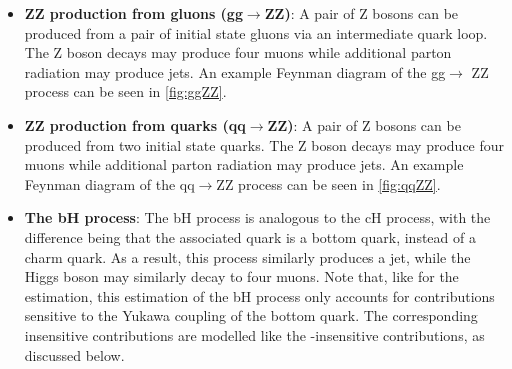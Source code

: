 \begin{itemize}
    \item \textbf{ZZ production from gluons (gg$\rightarrow$ZZ)}: A pair of Z bosons can be produced from a pair of initial state gluons via an intermediate quark loop. The Z boson decays may produce four muons while additional parton radiation may produce jets. An example Feynman diagram of the gg$\rightarrow$ ZZ process can be seen in \autoref{fig:ggZZ}.
    \item \textbf{ZZ production from quarks (qq$\rightarrow$ZZ)}: A pair of Z bosons can be produced from two initial state quarks. The Z boson decays may produce four muons while additional parton radiation may produce jets. An example Feynman diagram of the qq$\rightarrow$ZZ process can be seen in \autoref{fig:qqZZ}.
    \item \textbf{The bH process}: The bH process is analogous to the cH process, with the difference being that the associated quark is a bottom quark, instead of a charm quark. As a result, this process similarly produces a jet, while the Higgs boson may similarly decay to four muons. Note that, like for the \cHZZsen estimation, this estimation of the bH process only accounts for contributions sensitive to the Yukawa coupling of the bottom quark. The corresponding insensitive contributions are modelled like the \kappac-insensitive \cHZZ contributions, as discussed below.
\end{itemize}
